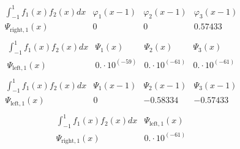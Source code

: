 \documentclass{article}
\begin{document}
\begin{landscape}
$$ \begin{array}{l|lll}
\int_{-1}^1 f_1(x)f_2(x) dx& \varphi_1(x-1)& \varphi_2(x-1)& \varphi_3(x-1) \\ \hline 
 \Psi_{\text{right},1}(x) & 0 & 0 & 0.57433 \\ 
\end{array} $$ 
$$ \begin{array}{l|lll}
\int_{-1}^1 f_1(x)f_2(x) dx& \Psi_1(x)& \Psi_2(x)& \Psi_3(x) \\ \hline 
 \Psi_{\text{left},1}(x) & 0.\cdot 10^{(-59)} & 0.\cdot 10^{(-61)} & 0.\cdot 10^{(-61)} \\ 
\end{array} $$ 
$$ \begin{array}{l|lll}
\int_{-1}^1 f_1(x)f_2(x) dx& \Psi_1(x-1)& \Psi_2(x-1)& \Psi_3(x-1) \\ \hline 
 \Psi_{\text{left},1}(x) & 0 & -0.58334 & -0.57433 \\ 
\end{array} $$ 
$$ \begin{array}{l|l}
\int_{-1}^1 f_1(x)f_2(x) dx& \Psi_{\text{left},1}(x) \\ \hline 
 \Psi_{\text{right},1}(x) & 0.\cdot 10^{(-61)} \\ 
\end{array} $$ 
\end{landscape}
\end{document}
